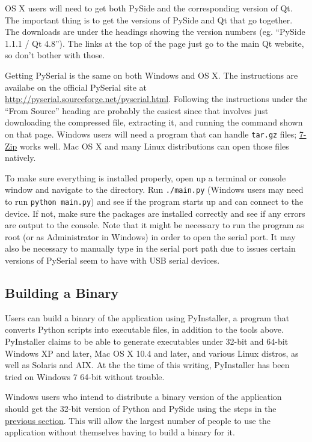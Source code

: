 \documentclass{article}
\begin{document}
OS X users will need to get both PySide and the corresponding version of Qt.  The important thing is
to get the versions of PySide and Qt that go together.  The downloads are under the headings
showing the version numbers (eg. ``PySide 1.1.1 / Qt 4.8'').  The links at the top of the page just
go to the main Qt website, so don't bother with those.

Getting PySerial is the same on both Windows and OS X.  The instructions are availabe on the
official PySerial site at \url{http://pyserial.sourceforge.net/pyserial.html}.  Following the
instructions under the ``From Source'' heading are probably the easiest since that involves just
downloading the compressed file, extracting it, and running the command shown on that page.  Windows
users will need a program that can handle \texttt{tar.gz} files; \href{http://www.7-zip.org/}{7-Zip}
works well.  Mac OS X and many Linux distributions can open those files natively.

To make sure everything is installed properly, open up a terminal or console window and navigate to
the  directory.  Run \texttt{./main.py} (Windows users may need to run
\texttt{python main.py}) and see if the program starts up and can connect to the device.  If not,
make sure the packages are installed correctly and see if any errors are output to the console.
Note that it might be necessary to run the program as root (or as Administrator in Windows) in order
to open the serial port.  It may also be necessary to manually type in the serial port path due to
issues certain versions of PySerial seem to have with USB serial devices.

\subsection{Building a Binary} \label{ssec:SWBuildBinary} 
Users can build a binary of the application using PyInstaller, a program that converts Python
scripts into executable files, in addition to the tools above.  PyInstaller claims to be able to
generate executables under 32-bit and 64-bit Windows XP and later, Mac OS X 10.4 and later, and
various Linux distros, as well as Solaris and AIX.  At the the time of this writing, PyInstaller has
been tried on Windows 7 64-bit without trouble.

Windows users who intend to distribute a binary version of the application should get the 32-bit
version of Python and PySide using the steps in the \hyperref[ssec:SWTools]{previous section}.  This
will allow the largest number of people to use the application without themselves having to build a
binary for it.
\end{document}
